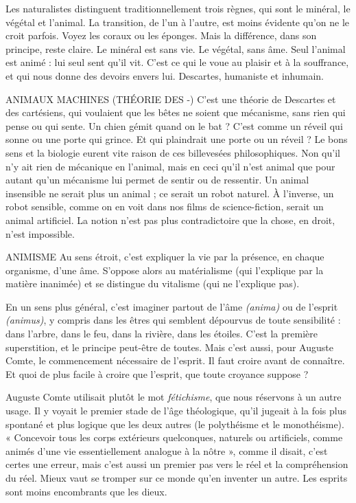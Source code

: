 Les naturalistes distinguent traditionnellement trois règnes, qui sont le
minéral, le végétal et l'animal. La transition, de l’un à l’autre, est moins évidente
qu’on ne le croit parfois. Voyez les coraux ou les éponges. Mais la différence,
dans son principe, reste claire. Le minéral est sans vie. Le végétal, sans
âme. Seul l'animal est animé : lui seul sent qu’il vit. C’est ce qui le voue au
plaisir et à la souffrance, et qui nous donne des devoirs envers lui. Descartes,
humaniste et inhumain.

ANIMAUX MACHINES (THÉORIE DES -) C'est une théorie de Descartes
et des cartésiens, qui voulaient
que les bêtes ne soient que mécanisme, sans rien qui pense ou qui sente. Un
chien gémit quand on le bat ? C’est comme un réveil qui sonne ou une porte
qui grince. Et qui plaindrait une porte ou un réveil ? Le bons sens et la biologie
eurent vite raison de ces billevesées philosophiques. Non qu’il n’y ait
rien de mécanique en l’animal, mais en ceci qu’il n’est animal que pour
autant qu'un mécanisme lui permet de sentir ou de ressentir. Un animal
insensible ne serait plus un animal ; ce serait un robot naturel. À l'inverse, un
robot sensible, comme on en voit dans nos films de science-fiction, serait un
animal artificiel. La notion n’est pas plus contradictoire que la chose, en
droit, n’est impossible.

ANIMISME Au sens étroit, c’est expliquer la vie par la présence, en chaque
organisme, d’une âme. S’oppose alors au matérialisme (qui
l'explique par la matière inanimée) et se distingue du vitalisme (qui ne
l'explique pas).

En un sens plus général, c’est imaginer partout de l’âme {\it (anima)} ou de
l'esprit {\it (animus)}, y compris dans les êtres qui semblent dépourvus de toute
sensibilité : dans l'arbre, dans le feu, dans la rivière, dans les étoiles. C’est la
première superstition, et le principe peut-être de toutes. Mais c’est aussi, pour
Auguste Comte, le commencement nécessaire de l'esprit. Il faut croire avant de
connaître. Et quoi de plus facile à croire que l'esprit, que toute croyance
suppose ?

Auguste Comte utilisait plutôt le mot {\it fétichisme}, que nous réservons à
un autre usage. Il y voyait le premier stade de l’âge théologique, qu’il jugeait
à la fois plus spontané et plus logique que les deux autres (le polythéisme et
le monothéisme). « Concevoir tous les corps extérieurs quelconques, naturels
ou artificiels, comme animés d’une vie essentiellement analogue à la
nôtre », comme il disait, c’est certes une erreur, mais c’est aussi un premier
pas vers le réel et la compréhension du réel. Mieux vaut se tromper sur ce
monde qu’en inventer un autre. Les esprits sont moins encombrants que les
dieux.

